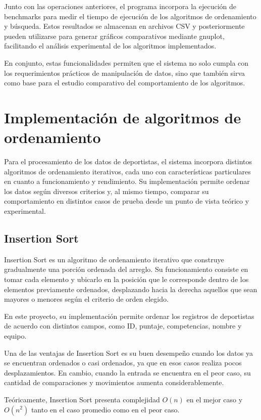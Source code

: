 Junto con las operaciones anteriores, el programa incorpora la ejecución de benchmarks para medir el tiempo de ejecución de los algoritmos de ordenamiento y búsqueda. Estos resultados se almacenan en archivos CSV y posteriormente pueden utilizarse para generar gráficos comparativos mediante gnuplot, facilitando el análisis experimental de los algoritmos implementados.

En conjunto, estas funcionalidades permiten que el sistema no solo cumpla con los requerimientos prácticos de manipulación de datos, sino que también sirva como base para el estudio comparativo del comportamiento de los algoritmos.
\section{Implementación de algoritmos de ordenamiento}
Para el procesamiento de los datos de deportistas, el sistema incorpora distintos algoritmos de ordenamiento iterativos, cada uno con características particulares en cuanto a funcionamiento y rendimiento. Su implementación permite ordenar los datos según diversos criterios y, al mismo tiempo, comparar su comportamiento en distintos casos de prueba desde un punto de vista teórico y experimental.


\label{subsec:bubblesort}
\subsection{Insertion Sort}
Insertion Sort es un algoritmo de ordenamiento iterativo que construye gradualmente una porción ordenada del arreglo. Su funcionamiento consiste en tomar cada elemento y ubicarlo en la posición que le corresponde dentro de los elementos previamente ordenados, desplazando hacia la derecha aquellos que sean mayores o menores según el criterio de orden elegido.

En este proyecto, su implementación permite ordenar los registros de deportistas de acuerdo con distintos campos, como ID, puntaje, competencias, nombre y equipo.

Una de las ventajas de Insertion Sort es su buen desempeño cuando los datos ya se encuentran ordenados o casi ordenados, ya que en esos casos realiza pocos desplazamientos. En cambio, cuando la entrada se encuentra en el peor caso, su cantidad de comparaciones y movimientos aumenta considerablemente.

Teóricamente, Insertion Sort presenta complejidad \(O(n)\) en el mejor caso y \(O(n^2)\) tanto en el caso promedio como en el peor caso.

